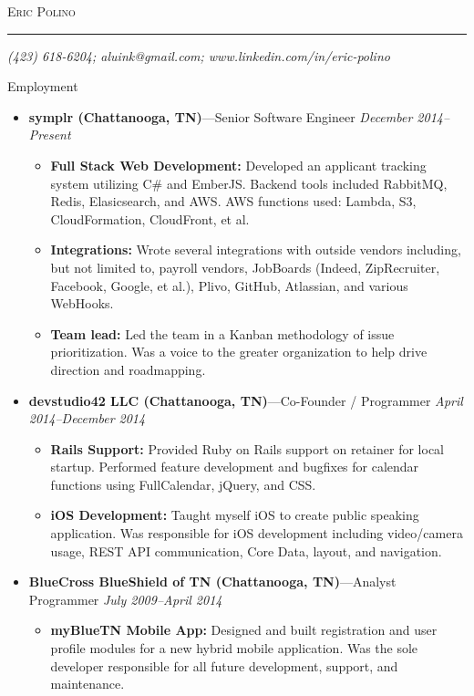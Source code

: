 \documentclass[11pt,oneside]{article}
\makeatletter
\newcommand{\name}{Eric Polino}
\newcommand{\phone}{(423) 618-6204}
\newcommand{\email}{aluink@gmail.com}
\newcommand{\linkedin}{www.linkedin.com/in/eric-polino}
\newcommand{\bigname}[1]{
	\begin{center}\fontfamily{phv}\selectfont\Huge\scshape#1\end{center}
}
\newenvironment{ressection}[1]{
	\vspace{4pt}
	{\fontfamily{phv}\selectfont\Large#1}
	\begin{itemize}
	\vspace{3pt}
}{
	\end{itemize}
}
\newcommand{\ressubitem}[1]{
	\vspace{-1pt}
	\item \begin{flushleft} #1 \end{flushleft}
}
\newcommand{\resbigitem}[3]{
	\vspace{-5pt}
	\item
	{\textbf{#1}---#2 \hfill \textit{#3}}
}
\newenvironment{restitledposition}[3]{
	\resbigitem{#1}{#2}{#3}
	\vspace{-2pt}
	\begin{itemize}
}{
	\end{itemize}
}
\makeatother
\begin{document}
 \selectfont

\bigname{\name}

\vspace{-8pt} \rule{\textwidth}{1pt}

\vspace{-1pt} {\small\itshape \hfill \phone; \email; \linkedin \hfill}

\vspace{8 pt}

\begin{ressection}{Employment}
	\begin{restitledposition}{symplr (Chattanooga, TN)}{Senior Software Engineer}{December 2014--Present}
    \ressubitem{\textbf{Full Stack Web Development:} Developed an applicant tracking system utilizing C\# and EmberJS.
		Backend tools included RabbitMQ, Redis, Elasicsearch, and AWS. AWS functions used: Lambda, S3,
		CloudFormation, CloudFront, et al.}

		\ressubitem{\textbf{Integrations:} Wrote several integrations with outside vendors including, but not
		limited to, payroll vendors, JobBoards (Indeed, ZipRecruiter, Facebook, Google, et al.), Plivo, GitHub,
		Atlassian, and various WebHooks.}

		\ressubitem{\textbf{Team lead:} Led the team in a Kanban methodology of issue prioritization. Was a voice
		to the greater organization to help drive direction and roadmapping.}
  \end{restitledposition}

  \begin{restitledposition}{devstudio42 LLC (Chattanooga, TN)}{Co-Founder / Programmer}{April 2014--December 2014}
    \ressubitem{\textbf{Rails Support:} Provided Ruby on Rails support on retainer for local startup.
    Performed feature development and bugfixes for calendar functions using FullCalendar, jQuery, and CSS.}
    \ressubitem{\textbf{iOS Development:} Taught myself iOS to create public speaking application.
    Was responsible for iOS development including video/camera usage, REST API communication, 
    Core Data, layout, and navigation.}
  \end{restitledposition}

	\begin{restitledposition}{BlueCross BlueShield of TN (Chattanooga, TN)}{Analyst Programmer}{July 2009--April 2014}
    \ressubitem{\textbf{myBlueTN Mobile App:} Designed and built registration
    and user profile modules for a new hybrid mobile application. 
    Was the sole developer responsible for all future development, support, and 
    maintenance.}


\end{restitledposition}
\end{ressection}
\end{document}
